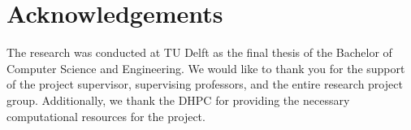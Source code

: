 \section{Acknowledgements}
\label{sec:acknowledgements}

The research was conducted at TU Delft as the final thesis of the Bachelor of Computer Science and Engineering. We would like to thank you for the support of the project supervisor, supervising professors, and the entire research project group. Additionally, we thank the DHPC \cite{DHPC2024} for providing the necessary computational resources for the project.